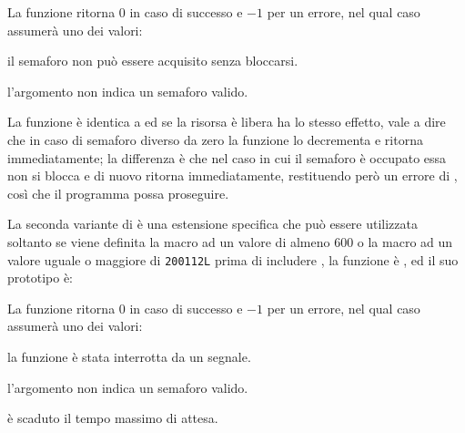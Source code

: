 \begin{funcproto}{

}
{La funzione ritorna $0$ in caso di successo e $-1$ per un errore, nel qual
  caso  assumerà uno dei valori:
  \begin{errlist}
    \item[\errcode{EAGAIN}] il semaforo non può essere acquisito senza
      bloccarsi. 
    \item[\errcode{EINVAL}] l'argomento  non indica un semaforo
      valido.
  \end{errlist}
}
\end{funcproto}

La funzione è identica a  ed se la risorsa è libera ha lo
stesso effetto, vale a dire che in caso di semaforo diverso da zero la
funzione lo decrementa e ritorna immediatamente; la differenza è che nel caso
in cui il semaforo è occupato essa non si blocca e di nuovo ritorna
immediatamente, restituendo però un errore di , così che il
programma possa proseguire.

La seconda variante di  è una estensione specifica che può
essere utilizzata soltanto se viene definita la macro 
ad un valore di almeno 600 o la macro  ad un valore
uguale o maggiore di \texttt{200112L} prima di includere
, la funzione è , ed il suo
prototipo è:

\begin{funcproto}{

}

{La funzione ritorna $0$ in caso di successo e $-1$ per un errore, nel qual
  caso  assumerà uno dei valori:
  \begin{errlist}
    \item[\errcode{EINTR}] la funzione è stata interrotta da un segnale.
    \item[\errcode{EINVAL}] l'argomento  non indica un semaforo
      valido.
    \item[\errcode{ETIMEDOUT}] è scaduto il tempo massimo di attesa. 
  \end{errlist}
}  
\end{funcproto}

